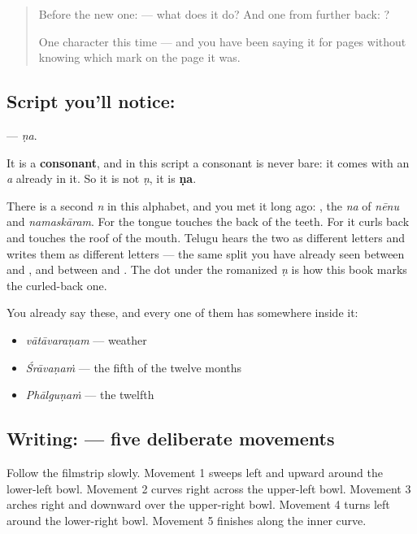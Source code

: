 \begin{quote}
Before the new one:  — what does it do? And one from further back: ?

One character this time — and you have been saying it for pages without knowing which mark on the page it was.
\end{quote}

\subsection*{Script you'll notice: }
\textbf{} — \emph{ṇa}.

It is a \textbf{consonant}, and in this script a consonant is never bare: it comes with an \emph{a} already in it. So it is not \emph{ṇ}, it is \textbf{ṇa}.

There is a second \emph{n} in this alphabet, and you met it long ago: \textbf{}, the \emph{na} of \emph{nēnu} and \emph{namaskāram}. For  the tongue touches the back of the teeth. For \textbf{} it curls back and touches the roof of the mouth. Telugu hears the two as different letters and writes them as different letters — the same split you have already seen between \textbf{} and \textbf{}, and between \textbf{} and \textbf{}. The dot under the romanized \emph{ṇ} is how this book marks the curled-back one.

You already say these, and every one of them has  somewhere inside it:

\begin{itemize}
\raggedright
  \item \textbf{} \emph{vātāvaraṇam} — weather
  \item \textbf{} \emph{Śrāvaṇaṁ} — the fifth of the twelve months
  \item \textbf{} \emph{Phālguṇaṁ} — the twelfth
\end{itemize}

\subsection*{Writing:  — five deliberate movements}

Follow the filmstrip slowly. Movement 1 sweeps left and upward around the lower-left bowl. Movement 2 curves right across the upper-left bowl. Movement 3 arches right and downward over the upper-right bowl. Movement 4 turns left around the lower-right bowl. Movement 5 finishes along the inner curve.

